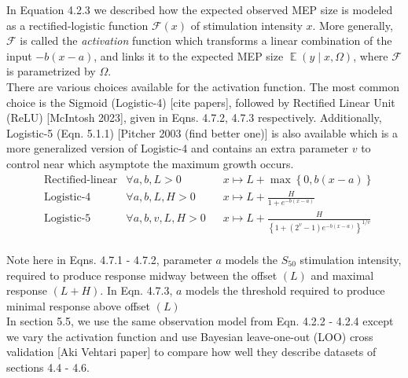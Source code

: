 \documentclass[a4paper,12pt]{article}
\DeclareMathOperator{\E}{\mathbb{E}}
\begin{document}
    In Equation 4.2.3 we described how the expected observed MEP size is modeled as a rectified-logistic function $\mathcal{F}\left(x\right)$ of stimulation intensity $x$. More generally, $\mathcal{F}$ is called the \textit{activation} function which transforms a linear combination of the input $-b(x - a)$, and links it to the expected MEP size $\E(y \mid x, \Omega)$, where $\mathcal{F}$ is parametrized by $\Omega$.\\

    There are various choices available for the activation function. The most common choice is the Sigmoid (Logistic-4) [cite papers], followed by Rectified Linear Unit (ReLU) [McIntosh 2023], given in Eqns. 4.7.2, 4.7.3 respectively. Additionally, Logistic-5 (Eqn. 5.1.1) [Pitcher 2003 (find better one)] is also available which is a more generalized version of Logistic-4 and contains an extra parameter $v$ to control near which asymptote the maximum growth occurs.\\
    \begin{align*}
        &\text{Rectified-linear} & \forall a, b, L > 0\ \;\;&x \mapsto L + \max\left\{0, b\left(x - a\right)\right\}  \tag{4.1.1}\\
        &\text{Logistic-4} & \forall a, b, L, H > 0\ \;\;&x \mapsto L + \frac{H}{1 + e^{-b\left(x-a\right)}}  \tag{4.1.2}\\
        &\text{Logistic-5} & \forall a, b, v, L, H > 0\ \;\;&x \mapsto L + \frac{H}{\left\{1 + \left(2^v - 1\right)e^{-b\left(x-a\right)}\right\}^{1/v}}  \tag{4.1.3}\\
    \end{align*}

    Note here in Eqns. 4.7.1 - 4.7.2, parameter $a$ models the $S_{50}$ stimulation intensity, required to produce response midway between the offset $(L)$ and maximal response $(L + H)$. In Eqn. 4.7.3, $a$ models the threshold required to produce minimal response above offset $(L)$\\

    In section 5.5, we use the same observation model from Eqn. 4.2.2 - 4.2.4 except we vary the activation function and use Bayesian leave-one-out (LOO) cross validation [Aki Vehtari paper] to compare how well they describe datasets of sections 4.4 - 4.6.
\end{document}
